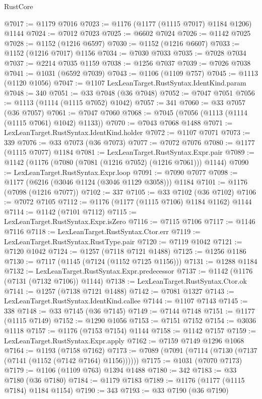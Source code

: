 \begin{lexlean}{RustCore}
\begin{coremodule}
@7017 := @1179 @7016
@7023 := @1176 (@1177 (@1115 @7017) @1184 @1206) @1144
@7024 := @7012 @7023
@7025 := @6602 @7024
@7026 := @1142 @7025
@7028 := @1152 (@1216 @6597)
@7030 := @1152 (@1216 @6607)
@7033 := @1152 (@1216 @7017) @1156
@7034 := @7030 @7033
@7035 := @7028 @7034
@7037 := @2214 @7035 @1159
@7038 := @1256 @7037
@7039 := @7026 @7038
@7041 := @1031 (@6592 @7039)
@7043 := @1106 (@1109 @757)
@7045 := @1113 (@1120 @1056)
@7047 := @1107 LexLeanTarget.RustSyntax.IdentKind.param
@7048 := 340
@7051 := @33 @7048 (@36 @7048)
@7052 := @7047 @7051
@7056 := @1113 (@1114 (@1115 @7052) @1042)
@7057 := 341
@7060 := @33 @7057 (@36 @7057)
@7061 := @7047 @7060
@7068 := @7045 (@7056 (@1113 (@1114 (@1115 @7061) @1042) @1133))
@7070 := @7043 @7068 @1488
@7071 := LexLeanTarget.RustSyntax.IdentKind.holder
@7072 := @1107 @7071
@7073 := 339
@7076 := @33 @7073 (@36 @7073)
@7077 := @7072 @7076
@7080 := @1177 (@1115 @7077) @1184
@7081 := LexLeanTarget.RustSyntax.Expr.pair
@7089 := @1142 (@1176 (@7080 (@7081 (@1216 @7052) (@1216 @7061))) @1144)
@7090 := LexLeanTarget.RustSyntax.Expr.loop
@7091 := @7090 @7077
@7098 := @1177 (@6216 (@3046 @1124 (@3046 @1129 @3058))) @1184
@7101 := @1176 (@7098 (@1216 @7077))
@7102 := 337
@7105 := @33 @7102 (@36 @7102)
@7106 := @7072 @7105
@7112 := @1176 (@1177 (@1115 @7106) @1184 @1162) @1144
@7114 := @1142 (@7101 @7112)
@7115 := LexLeanTarget.RustSyntax.Expr.isZero
@7116 := @7115 @7106
@7117 := @1146 @7116
@7118 := LexLeanTarget.RustSyntax.Ctor.err
@7119 := LexLeanTarget.RustSyntax.RustType.pair
@7120 := @7119 @1042
@7121 := @7120 @1042
@7124 := @1257 (@7118 @7121 @1488)
@7125 := @1256 @1186
@7130 := @7117 (@1145 (@7124 (@1152 @7125 @1156)))
@7131 := @1288 @1184
@7132 := LexLeanTarget.RustSyntax.Expr.predecessor
@7137 := @1142 (@1176 (@7131 (@7132 @7106)) @1144)
@7138 := LexLeanTarget.RustSyntax.Ctor.ok
@7141 := @1257 (@7138 @7121 @1488)
@7142 := @7081 @1327
@7143 := LexLeanTarget.RustSyntax.IdentKind.callee
@7144 := @1107 @7143
@7145 := 338
@7148 := @33 @7145 (@36 @7145)
@7149 := @7144 @7148
@7151 := @1177 (@1115 @7149)
@7152 := @1290 @1056
@7153 := @7151 @7152
@7154 := @3036 @1118
@7157 := @1176 (@7153 @7154) @1144
@7158 := @1142 @7157
@7159 := LexLeanTarget.RustSyntax.Expr.apply
@7162 := @7159 @7149 @1296 @1068
@7164 := @1193 (@7158 @7162)
@7173 := @7089 (@7091 (@7114 (@7130 (@7137 (@7141 (@1152 (@7142 @7164) @1156))))))
@7175 := @1031 (@7070 @7173)
@7179 := @1106 (@1109 @763) @1394 @1488
@7180 := 342
@7183 := @33 @7180 (@36 @7180)
@7184 := @1179 @7183
@7189 := @1176 (@1177 (@1115 @7184) @1184 @1154)
@7190 := 343
@7193 := @33 @7190 (@36 @7190)

\end{coremodule}
\end{lexlean}
